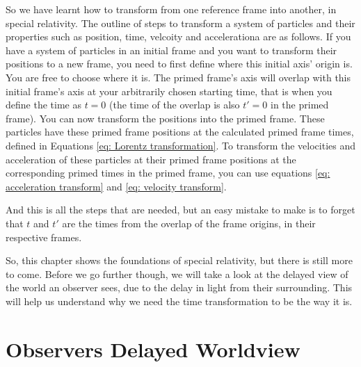 So we have learnt how to transform from one reference frame into another, in special relativity.
The outline of steps to transform a system of particles and their properties such as position, time, velcoity and accelerationa are as follows.
If you have a system of particles in an initial frame and you want to transform their positions to a new frame, you need to first define where this initial axis' origin is.
You are free to choose where it is.
The primed frame's axis will overlap with this initial frame's axis at your arbitrarily chosen starting time, that is when you define the time as ${t}=0$ (the time of the overlap is also ${t{'}}=0$ in the primed frame).
You can now transform the positions into the primed frame.
These particles have these primed frame positions at the calculated primed frame times, defined in Equations \eqref{eq: Lorentz transformation}.
To transform the velocities and acceleration of these particles at their primed frame positions at the corresponding primed times in the primed frame, you can use equations \eqref{eq: acceleration transform} and \eqref{eq: velocity transform}.

And this is all the steps that are needed, but an easy mistake to make is to forget that ${t}$ and ${t{'}}$ are the times from the overlap of the frame origins, in their respective frames.

So, this chapter shows the foundations of special relativity, but there is still more to come.
Before we go further though, we will take a look at the delayed view of the world an observer sees, due to the delay in light from their surrounding.
This will help us understand why we need the time transformation to be the way it is.



\printbibliography[segment=\therefsegment, heading=subbibliography]

\chapter{Observers Delayed Worldview} \label{ch: Observers Delayed Worldview}

